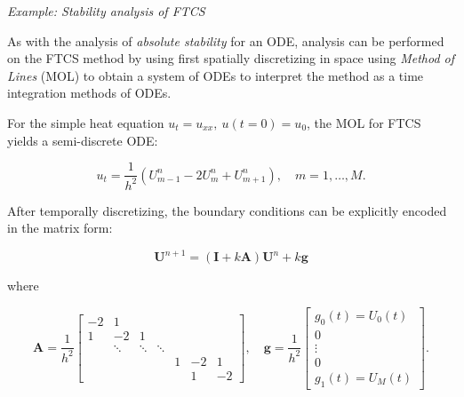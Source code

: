 \vspace{0.5cm}
\begin{tcolorbox}[colback=yellow!5!white,colframe=yellow!75!black]
    \textit{Example: Stability analysis of FTCS}
    \vspace{0.25cm}

    As with the analysis of \textit{absolute stability} for an ODE, analysis can be performed on the FTCS method by using first spatially discretizing in space using \textit{Method of Lines} (MOL) to obtain a system of ODEs to interpret the method as a time integration methods of ODEs. 

    For the simple heat equation $u_t = u_{xx}, \ u(t=0) = u_0$, the MOL for FTCS yields a semi-discrete ODE: 

    \begin{equation}
        u_t = \frac{1}{h^2}(U_{m-1}^{n} - 2U_{m}^{n} + U_{m+1}^n), \quad m = 1, \dots, M. 
    \end{equation}

    After temporally discretizing, the boundary conditions can be explicitly encoded in the matrix form: 

    \begin{equation}
        \boldsymbol{U}^{n+1} = (\boldsymbol{I} + k\boldsymbol{A}) \boldsymbol{U}^{n} + k\boldsymbol{g}
    \end{equation}

    where 

    \begin{equation}
        \boldsymbol{A} = 
        \frac{1}{h^2}
        \begin{bmatrix}
            -2 &  1     &        &        &     &    &   \\
            1  & -2     & 1      &        &     &    &   \\
               & \ddots & \ddots & \ddots &     &    &   \\ 
               &        &        &        &  1  & -2 & 1 \\
               &        &        &        &     &  1 & -2
        \end{bmatrix}, \quad 
        \boldsymbol{g} = \frac{1}{h^2}
        \begin{bmatrix}
            g_0(t) = U_0(t) \\
            0 \\
            \vdots \\
            0 \\
            g_{1}(t) = U_{M}(t)
        \end{bmatrix}. 
    \end{equation}


\end{tcolorbox}
